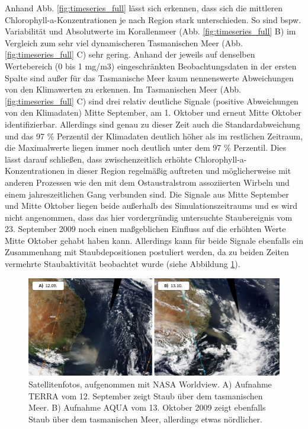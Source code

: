 \documentclass[12pt,a4paper,onecolumn,draft]{scrartcl}
\begin{document}
Anhand Abb. \ref{fig:timeseries_full} lässt sich erkennen, dass sich die mittleren Chlorophyll-a-Konzentrationen je nach Region stark unterschieden. So sind bspw. Variabilität und Absolutwerte im Korallenmeer (Abb. \ref{fig:timeseries_full} B) im Vergleich zum sehr viel dynamischeren Tasmanischen Meer (Abb. \ref{fig:timeseries_full} C) sehr gering. Anhand der jeweils auf denselben Wertebereich (0 bis 1 mg/m3) eingeschränkten Beobachtungsdaten in der ersten Spalte sind außer für das Tasmanische Meer kaum nennenswerte Abweichungen von den Klimawerten zu erkennen. Im Tasmanischen Meer (Abb. \ref{fig:timeseries_full} C) sind drei relativ deutliche Signale (positive Abweichungen von den Klimadaten) Mitte September, am 1. Oktober und erneut Mitte Oktober identifizierbar. Allerdings sind genau zu dieser Zeit auch die Standardabweichung und das 97 \% Perzentil der Klimadaten deutlich höher als im restlichen Zeitraum, die Maximalwerte liegen immer noch deutlich unter dem 97 \% Perzentil. Dies lässt darauf schließen, dass zwischenzeitlich erhöhte Chlorophyll-a-Konzentrationen in dieser Region regelmäßig auftreten und möglicherweise mit anderen Prozessen wie den mit dem Ostaustralstrom assoziierten Wirbeln und einem jahreszeitlichen Gang \citep{Tilburg.2002} verbunden sind. Die Signale aus Mitte September und Mitte Oktober liegen beide außerhalb des Simulationszeitraums und es wird nicht angenommen, dass das hier vordergründig untersuchte Staubereignis vom 23. September 2009 noch einen maßgeblichen Einfluss auf die erhöhten Werte Mitte Oktober gehabt haben kann. Allerdings kann für beide Signale ebenfalls ein Zusammenhang mit Staubdepositionen postuliert werden, da zu beiden Zeiten vermehrte Staubaktivität beobachtet wurde (siehe Abbildung \ref{fig:duststorms_surrounding}). 
\begin{figure}
\includegraphics[width=\textwidth]{bilder/duststorms_surround.png}
\caption{Satellitenfotos, aufgenommen mit NASA Worldview. A) Aufnahme TERRA vom 12. September zeigt Staub über dem tasmanischen Meer. B) Aufnahme AQUA vom 13. Oktober 2009 zeigt ebenfalls Staub über dem tasmanischen Meer, allerdings etwas nördlicher. } \label{fig:duststorms_surrounding}
\end{figure}
\end{document}
